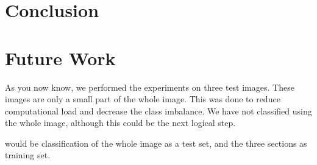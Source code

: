 \section{Conclusion}



\section{Future Work}
As you now know, we performed the experiments on three test images. These images are only a small part of the whole image. This was done to reduce computational load and decrease the class imbalance. We have not classified using the whole image, although this could be the next logical step.

would be classification of the whole image as a test set, and the three sections as training set. 